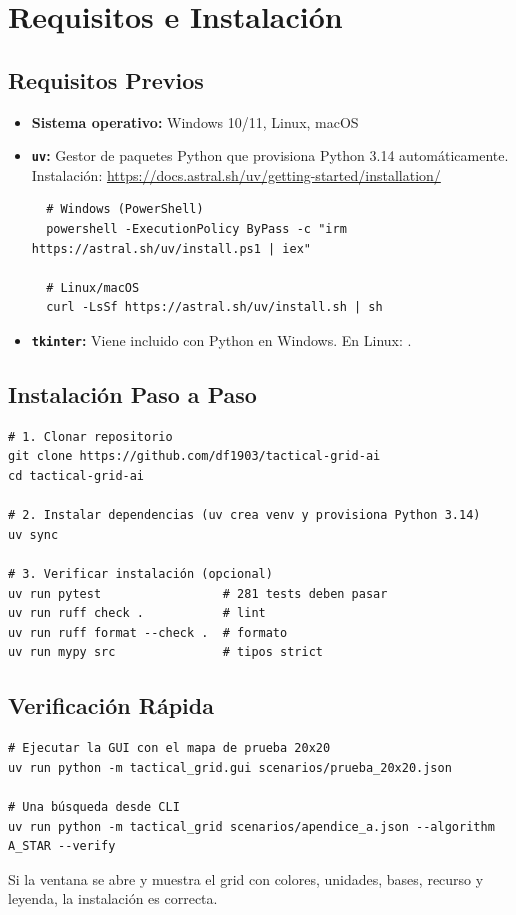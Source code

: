 \chapter{Requisitos e Instalación}
\label{man:requisitos}

\section{Requisitos Previos}
\label{sec:requisitos-previos}

\begin{itemize}
\item \textbf{Sistema operativo:} Windows 10/11, Linux, macOS
\item \textbf{\texttt{uv}:} Gestor de paquetes Python que provisiona Python 3.14 automáticamente.
  Instalación: \url{https://docs.astral.sh/uv/getting-started/installation/}
  \begin{verbatim}
  # Windows (PowerShell)
  powershell -ExecutionPolicy ByPass -c "irm https://astral.sh/uv/install.ps1 | iex"
  
  # Linux/macOS
  curl -LsSf https://astral.sh/uv/install.sh | sh
  \end{verbatim}
\item \textbf{\texttt{tkinter}:} Viene incluido con Python en Windows. En Linux: .
\end{itemize}

\section{Instalación Paso a Paso}
\label{sec:instalacion-paso}

\begin{verbatim}
# 1. Clonar repositorio
git clone https://github.com/df1903/tactical-grid-ai
cd tactical-grid-ai

# 2. Instalar dependencias (uv crea venv y provisiona Python 3.14)
uv sync

# 3. Verificar instalación (opcional)
uv run pytest                 # 281 tests deben pasar
uv run ruff check .           # lint
uv run ruff format --check .  # formato
uv run mypy src               # tipos strict
\end{verbatim}

\section{Verificación Rápida}
\label{sec:verificacion-rapida}

\begin{verbatim}
# Ejecutar la GUI con el mapa de prueba 20x20
uv run python -m tactical_grid.gui scenarios/prueba_20x20.json

# Una búsqueda desde CLI
uv run python -m tactical_grid scenarios/apendice_a.json --algorithm A_STAR --verify
\end{verbatim}

Si la ventana se abre y muestra el grid con colores, unidades, bases, recurso y leyenda,
la instalación es correcta.